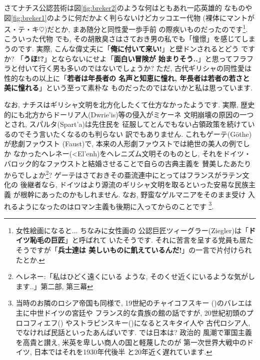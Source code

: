 さてナチス公認芸術は図\ref{fig:breker2}のような何はともあれ一応英雄的
なものや図\ref{fig:breker1}のように何だかよく判らないけどカッコエー代物
(裸体にマントがス・テ・キ$\heartsuit$)だとか, まあ随分と同性愛一歩手前
の際疾いものだったのです\footnote{女性絵画になると... ちなみに女性画の
公認巨匠ツィーグラー(Ziegler)は「\textbf{ドイツ恥毛の巨匠}」と呼ばれて
いたそうです. それに苦言を呈する党員も居たそうですが「\textbf{兵士達は
美しいものに飢えているんだ!}」の一言で片付けられたとか.}. こういった代物
でも, その胡散臭さはさておき男の私でも「憧憬」を感じてしまうのです.
 実際, こんな偉丈夫に「\textbf{俺に付いて来い!}」と壁ドンされるとどう
ですか? 「\textbf{うほ!?}」とならないにせよ「\textbf{面白い冒険が
始まりそう..}」と思ってフラフラと付いて行く男も多いのではないでしょうか?
 ただ, 古代ギリシャの同性愛は性的なもの以上に「\textbf{若者は年長者の
名声と知恵に憧れ, 年長者は若者の若さと美に憧れる}」という至って素朴な
ものだったのではないかと私は思っています.
\newline

なお, ナチスはギリシャ文明を北方化したくて仕方なかったようです. 実際,
 歴史的にも北方からドーリア人(\textgreek{Dwrie'is})等の侵入がミケーネ
文明崩壊の原因の一つとされ, スパルタ(\textgreek{Spart'a})は先住民を
征服してとんでもない占領政策を続けているのでそう言いたくなるのも判らない
訳でもありません. これもゲーテ(G\"othe)が悲劇ファウスト
(Faust)\cite{ゲーテ}で, 本来の人形劇ファウストでは絶世の美人の例でしか
なかったヘレネー(\textgreek{<El'enh})をヘレニズム文明そのものとし,
 それをドイツ・バロック的なファウストと結婚させることで自らの古典主義を
賛美したあたりからでしょか\footnote{ヘレネー:「私はひどく遠くにいる
ような, そのくせ近くにいるような気がします..」\cite{ゲーテ}第二部,
第三幕}?  ゲーテはさておきその亜流連中にとってはフランスがラテン文化の
後継者なら, ドイツはより源流のギリシャ文明を取るといった安易な民族主義
が根幹にあったのかもしれません. なお, 野蛮なゲルマニアをそのまま受け
入れるようになったのはロマン主義も後期に入ってからのことです
\footnote{当時のお隣のロシア帝国も同様で, 19世紀のチャイコフスキー
({})のバレエは主に中世ドイツの宮廷や
フランス的な貴族の館の話ですが, 20世紀初頭のプロコフィエフ({})
やストラビンスキー({})になるとスキタイ人や
古代ロシア人, でなければ民話といったあんばいです. では日本は? 政治的
風潮で軍国主義を高貴と讃え, 米英を卑しい商人の国と軽蔑したのが
第一次世界大戦中のドイツ\cite{クラウス}, 日本ではそれを1930年代後半
と20年近く遅れています.}.
\newline

